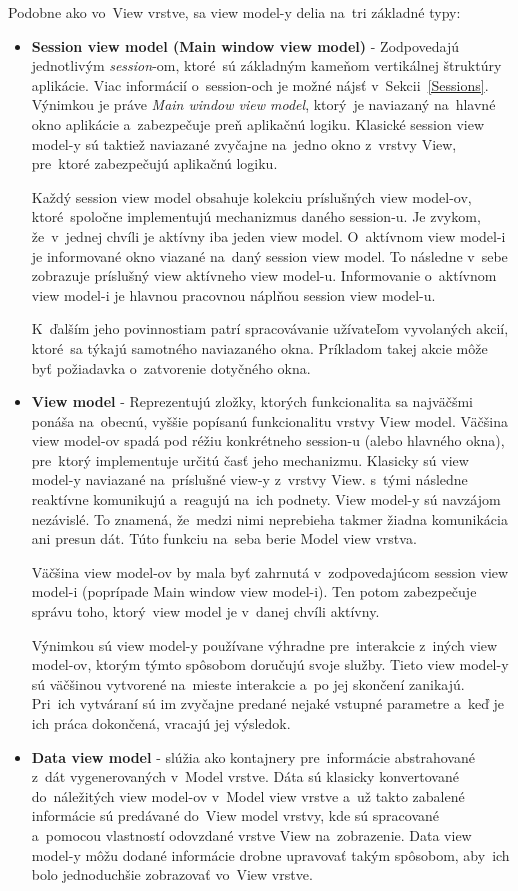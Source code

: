 Podobne ako vo~View vrstve, sa view model-y delia na~tri základné typy:
\begin{itemize}
    \item \textbf{Session view model (Main window view model)} - Zodpovedajú jednotlivým \textit{session}-om, ktoré~sú základným kameňom vertikálnej štruktúry aplikácie. Viac informácií o~session-och je možné nájsť v~Sekcii~\ref{Sessions}. Výnimkou je práve \textit{Main window view model}, ktorý~je naviazaný na~hlavné okno aplikácie a~zabezpečuje preň aplikačnú logiku. Klasické session view model-y sú taktiež naviazané zvyčajne na~jedno okno z~vrstvy View, pre~ktoré zabezpečujú aplikačnú logiku.
    
    Každý session view model obsahuje kolekciu príslušných view model-ov, ktoré~spoločne implementujú mechanizmus daného session-u. Je zvykom, že~v~jednej chvíli je aktívny iba jeden view model. O~aktívnom view model-i je informované okno viazané na~daný session view model. To následne v~sebe zobrazuje príslušný view aktívneho view model-u. Informovanie o~aktívnom view model-i je hlavnou pracovnou náplňou session view model-u.

    K~ďalším jeho povinnostiam patrí spracovávanie užívateľom vyvolaných akcií, ktoré~sa týkajú samotného naviazaného okna. Príkladom takej akcie môže byť požiadavka o~zatvorenie dotyčného okna.
    \item \textbf{View model} - Reprezentujú zložky, ktorých funkcionalita sa najväčšmi ponáša na~obecnú, vyššie popísanú funkcionalitu vrstvy View model. Väčšina view model-ov spadá pod réžiu konkrétneho session-u (alebo hlavného okna), pre~ktorý implementuje určitú časť jeho mechanizmu. Klasicky sú view model-y naviazané na~príslušné view-y z~vrstvy View. s~tými následne reaktívne komunikujú a~reagujú na~ich podnety. View model-y sú navzájom nezávislé. To znamená, že~medzi nimi neprebieha takmer žiadna komunikácia ani presun dát. Túto funkciu na~seba berie Model view vrstva.

    Väčšina view model-ov by mala byť zahrnutá v~zodpovedajúcom session view model-i (poprípade Main window view model-i). Ten potom zabezpečuje správu toho, ktorý~view model je v~danej chvíli aktívny. 
    
    Výnimkou sú view model-y používane výhradne pre~interakcie z~iných view model-ov, ktorým týmto spôsobom doručujú svoje služby. Tieto view model-y sú väčšinou vytvorené na~mieste interakcie a~po jej skončení zanikajú. Pri~ich vytváraní sú im zvyčajne predané nejaké vstupné parametre a~keď je ich práca dokončená, vracajú jej výsledok. 
    \item \textbf{Data view model} - slúžia ako kontajnery pre~informácie abstrahované z~dát vygenerovaných v~Model vrstve. Dáta sú klasicky konvertované do~náležitých view model-ov v~Model view vrstve a~už takto zabalené informácie sú predávané do~View model vrstvy, kde sú spracované a~pomocou vlastností odovzdané vrstve View na~zobrazenie. Data view model-y môžu dodané informácie drobne upravovať takým spôsobom, aby~ich bolo jednoduchšie zobrazovať vo~View vrstve.
    

\end{itemize}
